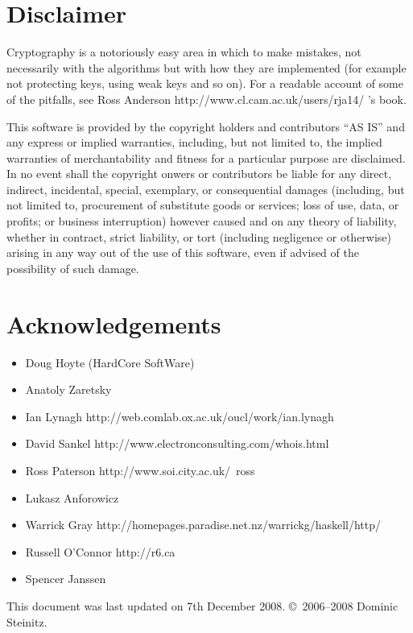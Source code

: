 \documentclass{article}
\begin{document}
\section{Disclaimer}
Cryptography is a notoriously easy area in which to make mistakes, 
not necessarily with the algorithms but with how they are implemented 
(for example not protecting keys, using weak keys and so on). 
For a readable account of some of the pitfalls, see 
\htmladdnormallinkfoot
{Ross Anderson}
{http://www.cl.cam.ac.uk/users/rja14/}
's book.

\begin{sc}
This software is provided by the copyright holders and contributors ``AS IS'' 
and any express or implied warranties, including, but not limited to, 
the implied warranties of merchantability and fitness for a particular 
purpose are disclaimed. In no event shall the copyright onwers or
contributors be liable for any direct, indirect, incidental, special,
exemplary, or consequential damages (including, but not limited to,
procurement of substitute goods or services; loss of use, data, or profits;
or business interruption) however caused and on any theory of liability,
whether in contract, strict liability, or tort (including negligence or
otherwise) arising in any way out of the use of this software,
even if advised of the possibility of such damage.
\end{sc}

\section{Acknowledgements}

\begin{itemize}
\item
Doug Hoyte (HardCore SoftWare)
\item
Anatoly Zaretsky
\item
\htmladdnormallinkfoot
   {Ian Lynagh}
   {http://web.comlab.ox.ac.uk/oucl/work/ian.lynagh}
\item
\htmladdnormallinkfoot
   {David Sankel}
   {http://www.electronconsulting.com/whois.html}
\item
\htmladdnormallinkfoot 
{Ross Paterson}
{http://www.soi.city.ac.uk/~ross}
\item
Lukasz Anforowicz
\item
\htmladdnormallinkfoot 
{Warrick Gray}
{http://homepages.paradise.net.nz/warrickg/haskell/http/}
\item
\htmladdnormallinkfoot 
{Russell O'Connor}
{http://r6.ca}
\item
Spencer Janssen
\end{itemize}

This document was last updated on 7th December 2008.
\copyright\ 2006--2008 Dominic Steinitz. 
\end{document}
